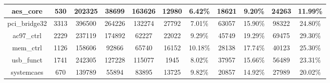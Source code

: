 \begin{table}[]
\begin{tabular}{|c|c|ccc|cccccc|}
                                                              aes\_core                & 530                        & \multicolumn{1}{c|}{202325}                 & \multicolumn{1}{c|}{38699}                    & 163626                 & \multicolumn{1}{c|}{12980}                       & \multicolumn{1}{c|}{6.42\%}   & \multicolumn{1}{c|}{18621}                       & \multicolumn{1}{c|}{9.20\%}   & \multicolumn{1}{c|}{24263}                       & 11.99\%  \\ \hline
                                                              pci\_bridge32            & 3313                       & \multicolumn{1}{c|}{396500}                 & \multicolumn{1}{c|}{264226}                   & 132274                 & \multicolumn{1}{c|}{27792}                       & \multicolumn{1}{c|}{7.01\%}   & \multicolumn{1}{c|}{63057}                       & \multicolumn{1}{c|}{15.90\%}  & \multicolumn{1}{c|}{98322}                       & 24.80\%  \\ \hline
                                                              ac97\_ctrl               & 2229                       & \multicolumn{1}{c|}{237119}                 & \multicolumn{1}{c|}{174892}                   & 62227                  & \multicolumn{1}{c|}{22022}                       & \multicolumn{1}{c|}{9.29\%}   & \multicolumn{1}{c|}{45749}                       & \multicolumn{1}{c|}{19.29\%}  & \multicolumn{1}{c|}{69475}                       & 29.30\%  \\ \hline
                                                              mem\_ctrl                & 1126                       & \multicolumn{1}{c|}{158606}                 & \multicolumn{1}{c|}{92866}                    & 65740                  & \multicolumn{1}{c|}{16152}                       & \multicolumn{1}{c|}{10.18\%}  & \multicolumn{1}{c|}{28138}                       & \multicolumn{1}{c|}{17.74\%}  & \multicolumn{1}{c|}{40123}                       & 25.30\%  \\ \hline
                                                              usb\_funct               & 1741                       & \multicolumn{1}{c|}{242305}                 & \multicolumn{1}{c|}{127228}                   & 115077                 & \multicolumn{1}{c|}{1945}                        & \multicolumn{1}{c|}{8.02\%}   & \multicolumn{1}{c|}{37957}                       & \multicolumn{1}{c|}{15.66\%}  & \multicolumn{1}{c|}{56489}                       & 23.31\%  \\ \hline
                                                              systemcaes               & 670                        & \multicolumn{1}{c|}{139789}                 & \multicolumn{1}{c|}{55894}                    & 83895                  & \multicolumn{1}{c|}{13725}                       & \multicolumn{1}{c|}{9.82\%}   & \multicolumn{1}{c|}{20857}                       & \multicolumn{1}{c|}{14.92\%}  & \multicolumn{1}{c|}{27989}                       & 20.02\%  \\ \hline
        \end{tabular}
    \end{table}


